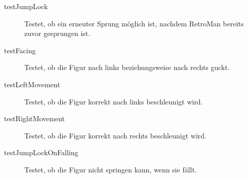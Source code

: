 \documentclass[parskip=full]{scrreprt}
\begin{document}
\begin{description}
	\item[testJumpLock] Testet, ob ein erneuter Sprung möglich ist, nachdem RetroMan bereits zuvor gesprungen ist.
	\item[testFacing] Testet, ob die Figur nach links beziehungsweise nach rechts guckt.
	\item[testLeftMovement] Testet, ob die Figur korrekt nach links beschleunigt wird.
	\item[testRightMovement] Testet, ob die Figur korrekt nach rechts beschleunigt wird.
	\item[testJumpLockOnFalling] Testet, ob die Figur nicht springen kann, wenn sie fällt.
\end{description}
\end{document}
